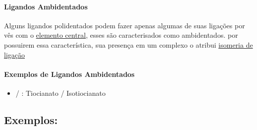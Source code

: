 \documentclass[12pt]{report}
\begin{document}
\paragraph{Ligandos Ambidentados}
Alguns ligandos polidentados podem fazer apenas algumas de suas ligações por vês com o \hyperlink{elemento central}{elemento central}, esses são caracterisados como ambidentados. por possuirem essa característica, sua presença em um complexo o atribui \hyperlink{isomeria de ligacao}{isomeria de ligação}

\paragraph{Exemplos de Ligandos Ambidentados}%
\begin{itemize}

	\item {} / : Tiocianato / Isotiocianato


\end{itemize}



\subsection{Exemplos:}
\end{document}
